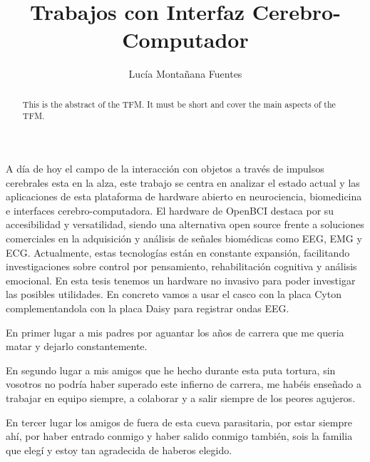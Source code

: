 \documentclass[twoside,spanish,a4paper,12pt]{tfg}
\title{Trabajos con Interfaz Cerebro-Computador}
\author{Lucía Montañana Fuentes}
\begin{document}
\portada
\cleardoublepage
\contraportada
\cleardoublepage
\declaracion
\cleardoublepage


\begin{resumen}
  A día de hoy el campo de la interacción con objetos a través de impulsos cerebrales esta en la alza, este trabajo se centra en analizar el estado actual y las aplicaciones de esta plataforma de hardware abierto en neurociencia, biomedicina e interfaces cerebro-computadora. El hardware de OpenBCI destaca por su accesibilidad y versatilidad, siendo una alternativa open source frente a soluciones comerciales en la adquisición y análisis de señales biomédicas como EEG, EMG y ECG. Actualmente, estas tecnologías están en constante expansión, facilitando investigaciones sobre control por pensamiento, rehabilitación cognitiva y análisis emocional. En esta tesis tenemos un hardware no invasivo para poder investigar las posibles utilidades. En concreto vamos a usar el casco con la placa Cyton complementandola con la placa Daisy para registrar ondas EEG.
\end{resumen}
\cleardoublepage

\begin{abstract}
  This is the abstract of the TFM. It must be short and cover the main aspects of the TFM.
\end{abstract}
\cleardoublepage

\cleardoublepage


\begin{agradecimientos}
  En primer lugar a mis padres por aguantar los años de carrera que me queria matar y dejarlo constantemente.

  En segundo lugar a mis amigos que he hecho durante esta puta tortura, sin vosotros no podría haber superado este infierno de carrera, me habéis enseñado a trabajar en equipo siempre, a colaborar y a salir siempre de los peores agujeros. 

  En tercer lugar los amigos de fuera de esta cueva parasitaria, por estar siempre ahí, por haber entrado conmigo y haber salido conmigo también, sois la familia que elegí y estoy tan agradecida de haberos elegido. 
\end{agradecimientos}
\cleardoublepage

\tableofcontents

\pagestyle{tfg}
\justify

\end{document}
